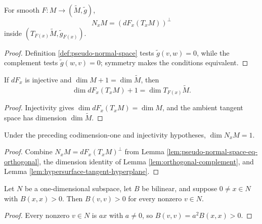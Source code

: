 \begin{lemma}
\label{lem:pseudo-normal-space-eq-orthogonal}
\leanok
{}
For smooth $F:M\to(\widetilde M,\widetilde g)$,
\[
N_xM=(dF_x(T_xM))^\perp
\]
inside $(T_{F(x)}\widetilde M,\widetilde g_{F(x)})$.
\end{lemma}
\begin{proof}
\leanok
{}
\sketch Definition \ref{def:pseudo-normal-space} tests $\widetilde g(v,w)=0$, while the complement tests $\widetilde g(w,v)=0$; symmetry makes the conditions equivalent.
\end{proof}

\begin{lemma}
\label{lem:hypersurface-tangent-hyperplane}
\leanok
If $dF_x$ is injective and $\dim M+1=\dim\widetilde M$, then
\[
\dim dF_x(T_xM)+1=\dim T_{F(x)}\widetilde M.
\]
\end{lemma}
\begin{proof}
\leanok
\sketch Injectivity gives $\dim dF_x(T_xM)=\dim M$, and the ambient tangent space has dimension $\dim\widetilde M$.
\end{proof}

\begin{lemma}
\label{lem:pseudo-normal-space-line}
\leanok
{}
Under the preceding codimension-one and injectivity hypotheses, $\dim N_xM=1$.
\end{lemma}
\begin{proof}
\leanok
{}
\sketch Combine $N_xM=dF_x(T_xM)^\perp$ from Lemma \ref{lem:pseudo-normal-space-eq-orthogonal}, the dimension identity of Lemma \ref{lem:orthogonal-complement}, and Lemma \ref{lem:hypersurface-tangent-hyperplane}.
\end{proof}

\begin{lemma}
\label{lem:line-sign-one-vector}
\leanok
Let $N$ be a one-dimensional subspace, let $B$ be bilinear, and suppose $0\ne x\in N$ with $B(x,x)>0$. Then $B(v,v)>0$ for every nonzero $v\in N$.
\end{lemma}
\begin{proof}
\leanok
\sketch Every nonzero $v\in N$ is $ax$ with $a\ne0$, so $B(v,v)=a^2B(x,x)>0$.
\end{proof}

